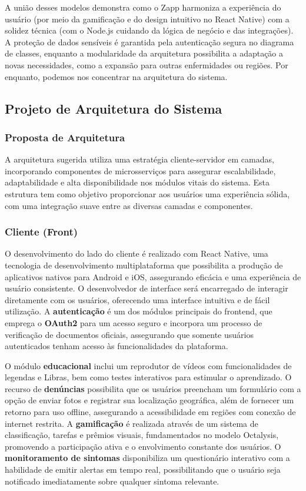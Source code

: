 \documentclass[a4paper, 12pt]{article}
\begin{document}
A união desses modelos demonstra como o Zapp harmoniza a experiência do usuário (por meio da gamificação e do design intuitivo no React Native) com a solidez técnica (com o Node.js cuidando da lógica de negócio e das integrações). A proteção de dados sensíveis é garantida pela autenticação segura no diagrama de classes, enquanto a modularidade da arquitetura possibilita a adaptação a novas necessidades, como a expansão para outras enfermidades ou regiões. Por enquanto, podemos nos concentrar na arquitetura do sistema.

\newpage
\subsection{Projeto de Arquitetura do Sistema}

\subsubsection{Proposta de Arquitetura}

A arquitetura sugerida utiliza uma estratégia cliente-servidor em camadas, incorporando componentes de microsserviços para assegurar escalabilidade, adaptabilidade e alta disponibilidade nos módulos vitais do sistema. Esta estrutura tem como objetivo proporcionar aos usuários uma experiência sólida, com uma integração suave entre as diversas camadas e componentes.

\subsubsection{Cliente (Front)}
 
 O desenvolvimento do lado do cliente é realizado com React Native, uma tecnologia de desenvolvimento multiplataforma que possibilita a produção de aplicativos nativos para Android e iOS, assegurando eficácia e uma experiência de usuário consistente.  O desenvolvedor de interface será encarregado de interagir diretamente com os usuários, oferecendo uma interface intuitiva e de fácil utilização.  A \textbf{autenticação} é um dos módulos principais do frontend, que emprega o \textbf{OAuth2} para um acesso seguro e incorpora um processo de verificação de documentos oficiais, assegurando que somente usuários autenticados tenham acesso às funcionalidades da plataforma.
 
O módulo \textbf{educacional} inclui um reprodutor de vídeos com funcionalidades de legendas e Libras, bem como testes interativos para estimular o aprendizado.  O recurso de \textbf{denúncias} possibilita que os usuários preencham um formulário com a opção de enviar fotos e registrar sua localização geográfica, além de fornecer um retorno para uso offline, assegurando a acessibilidade em regiões com conexão de internet restrita.  A \textbf{gamificação} é realizada através de um sistema de classificação, tarefas e prêmios visuais, fundamentados no modelo Octalysis, promovendo a participação ativa e o envolvimento constante dos usuários.  O \textbf{monitoramento de sintomas} disponibiliza um questionário interativo com a habilidade de emitir alertas em tempo real, possibilitando que o usuário seja notificado imediatamente sobre qualquer sintoma relevante.
\end{document}
